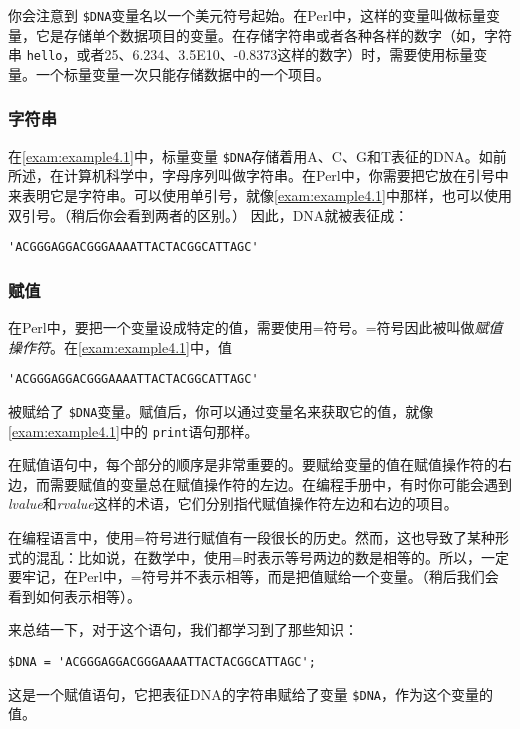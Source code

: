 你会注意到 \verb|$DNA|变量名以一个美元符号起始。在Perl中，这样的变量叫做标量变量，它是存储单个数据项目的变量。在存储字符串或者各种各样的数字（如，字符串 \verb|hello|，或者25、6.234、3.5E10、-0.8373这样的数字）时，需要使用标量变量。一个标量变量一次只能存储数据中的一个项目。

\subsubsection{字符串}
在\autoref{exam:example4.1}中，标量变量 \verb|$DNA|存储着用A、C、G和T表征的DNA。如前所述，在计算机科学中，字母序列叫做字符串。在Perl中，你需要把它放在引号中来表明它是字符串。可以使用单引号，就像\autoref{exam:example4.1}中那样，也可以使用双引号。（稍后你会看到两者的区别。）
因此，DNA就被表征成：

\begin{lstlisting}
'ACGGGAGGACGGGAAAATTACTACGGCATTAGC'
\end{lstlisting}

\subsubsection{赋值}
\label{sect:sect4.2.4.3}
在Perl中，要把一个变量设成特定的值，需要使用=符号。=符号因此被叫做\textit{赋值操作符}。在\autoref{exam:example4.1}中，值

\begin{lstlisting}
'ACGGGAGGACGGGAAAATTACTACGGCATTAGC' 
\end{lstlisting}
被赋给了 \verb|$DNA|变量。赋值后，你可以通过变量名来获取它的值，就像\autoref{exam:example4.1}中的 \verb|print|语句那样。

在赋值语句中，每个部分的顺序是非常重要的。要赋给变量的值在赋值操作符的右边，而需要赋值的变量总在赋值操作符的左边。在编程手册中，有时你可能会遇到\textit{lvalue}和\textit{rvalue}这样的术语，它们分别指代赋值操作符左边和右边的项目。

在编程语言中，使用=符号进行赋值有一段很长的历史。然而，这也导致了某种形式的混乱：比如说，在数学中，使用=时表示等号两边的数是相等的。所以，一定要牢记，在Perl中，=符号并不表示相等，而是把值赋给一个变量。（稍后我们会看到如何表示相等）。

来总结一下，对于这个语句，我们都学习到了那些知识：

\begin{lstlisting}
$DNA = 'ACGGGAGGACGGGAAAATTACTACGGCATTAGC';
\end{lstlisting}

这是一个赋值语句，它把表征DNA的字符串赋给了变量 \verb|$DNA|，作为这个变量的值。

